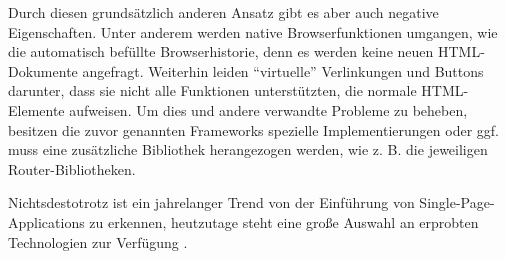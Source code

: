 Durch diesen grundsätzlich anderen Ansatz gibt es aber auch negative Eigenschaften. Unter anderem werden native Browserfunktionen umgangen, wie die automatisch befüllte Browserhistorie, denn es werden keine neuen HTML-Dokumente angefragt. Weiterhin leiden \enquote{virtuelle} Verlinkungen und Buttons darunter, dass sie nicht alle Funktionen unterstützten, die normale HTML-Elemente aufweisen. Um dies und andere verwandte Probleme zu beheben, besitzen die zuvor genannten Frameworks spezielle Implementierungen oder ggf. muss eine zusätzliche Bibliothek herangezogen werden, wie z. B. die jeweiligen Router-Bibliotheken.

Nichtsdestotrotz ist ein jahrelanger Trend von der Einführung von Single-Page-Applications zu erkennen, heutzutage steht eine große Auswahl an erprobten Technologien zur Verfügung \cite{TheStateOfJavaScript2020}.


